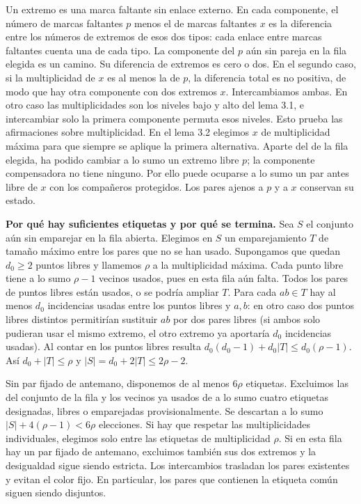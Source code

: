 \documentclass[spanish,11pt,a4paper]{article}
\begin{document}
Un extremo es una marca faltante sin enlace externo. En cada componente, el número de marcas faltantes \(p\) menos el de marcas faltantes \(x\) es la diferencia entre los números de extremos de esos dos tipos: cada enlace entre marcas faltantes cuenta una de cada tipo. La componente del \(p\) aún sin pareja en la fila elegida es un camino. Su diferencia de extremos es cero o dos. En el segundo caso, si la multiplicidad de \(x\) es al menos la de \(p\), la diferencia total es no positiva, de modo que hay otra componente con dos extremos \(x\). Intercambiamos ambas. En otro caso las multiplicidades son los niveles bajo y alto del lema 3.1, e intercambiar solo la primera componente permuta esos niveles. Esto prueba las afirmaciones sobre multiplicidad. En el lema 3.2 elegimos \(x\) de multiplicidad máxima para que siempre se aplique la primera alternativa. Aparte del de la fila elegida, ha podido cambiar a lo sumo un extremo libre \(p\); la componente compensadora no tiene ninguno. Por ello puede ocuparse a lo sumo un par antes libre de \(x\) con los compañeros protegidos. Los pares ajenos a \(p\) y a \(x\) conservan su estado.

\textbf{Por qué hay suficientes etiquetas y por qué se termina.} Sea \(S\) el conjunto aún sin emparejar en la fila abierta. Elegimos en \(S\) un emparejamiento \(T\) de tamaño máximo entre los pares que no se han usado. Supongamos que quedan \(d_0\ge2\) puntos libres y llamemos \(\rho\) a la multiplicidad máxima. Cada punto libre tiene a lo sumo \(\rho-1\) vecinos usados, pues en esta fila aún falta. Todos los pares de puntos libres están usados, o se podría ampliar \(T\). Para cada \(ab\in T\) hay al menos \(d_0\) incidencias usadas entre los puntos libres y \(a,b\): en otro caso dos puntos libres distintos permitirían sustituir \(ab\) por dos pares libres (si ambos solo pudieran usar el mismo extremo, el otro extremo ya aportaría \(d_0\) incidencias usadas). Al contar en los puntos libres resulta \(d_0(d_0-1)+d_0|T|\le d_0(\rho-1)\). Así \(d_0+|T|\le\rho\) y \(|S|=d_0+2|T|\le2\rho-2\).

Sin par fijado de antemano, disponemos de al menos \(6\rho\) etiquetas. Excluimos las del conjunto de la fila y los vecinos ya usados de a lo sumo cuatro etiquetas designadas, libres o emparejadas provisionalmente. Se descartan a lo sumo \(|S|+4(\rho-1)<6\rho\) elecciones. Si hay que respetar las multiplicidades individuales, elegimos solo entre las etiquetas de multiplicidad \(\rho\). Si en esta fila hay un par fijado de antemano, excluimos también sus dos extremos y la desigualdad sigue siendo estricta. Los intercambios trasladan los pares existentes y evitan el color fijo. En particular, los pares que contienen la etiqueta común siguen siendo disjuntos.
\end{document}
